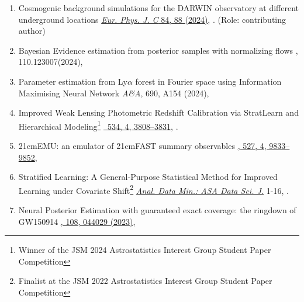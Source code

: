 \begin{enumerate}
\item
{}
{Cosmogenic background simulations for the DARWIN observatory at different underground locations}
{\href{https://doi.org/10.1140/epjc/s10052-023-12298-w}{{\em Eur. Phys. J. C} 84, 88 (2024)}, . (Role: contributing author)}

\item
{}
{Bayesian Evidence estimation from posterior samples with normalizing flows}
{\PRD, 110.123007(2024), }

\item
{}
{Parameter estimation from Ly$\alpha$ forest in Fourier space using Information Maximising Neural Network}
{{\em A\&A}, 690, A154 (2024),  }

\item
{}
{Improved Weak Lensing Photometric Redshift Calibration via StratLearn and Hierarchical Modeling\footnote{{Winner of the JSM 2024 Astrostatistics Interest Group Student Paper Competition}}}
{\href{https://doi.org/10.1093/mnras/stae2243}{\mnras\ 534, 4, 3808–3831}, . }

\item
{}
{21cmEMU: an emulator of 21cmFAST summary observables}
{\href{https://doi.org/10.1093/mnras/stad3849}{\mnras, 527, 4, 9833–9852}, }

\item
{}
{Stratified Learning: A General-Purpose Statistical Method for Improved Learning under Covariate Shift\footnote{Finalist at the JSM 2022 Astrostatistics Interest Group Student Paper Competition}}
{\href{https://doi.org/10.1002/sam.11643}{\em Anal. Data Min.: ASA Data Sci. J.} 1-16, .} 


\item
{}
{Neural Posterior Estimation with guaranteed exact coverage: the ringdown of GW150914}
{\href{https://link.aps.org/doi/10.1103/PhysRevD.108.044029}{\PRD, 108, 044029 (2023)}, }


\end{enumerate}
